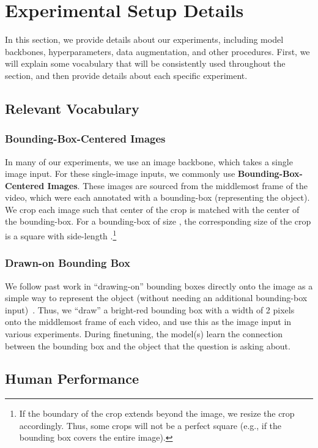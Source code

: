 \documentclass[runningheads]{llncs}
\begin{document}
\section{Experimental Setup Details}\label{appendix:experimental}

In this section, we provide details about our experiments, including model backbones, hyperparameters, data augmentation, and other procedures. First, we will explain some vocabulary that will be consistently used throughout the section, and then provide details about each specific experiment. 

\subsection{Relevant Vocabulary}

\subsubsection{Bounding-Box-Centered Images} In many of our experiments, we use an image backbone, which takes a single image input. For these single-image inputs, we commonly use \textbf{Bounding-Box-Centered Images}. These images are sourced from the middlemost frame of the video, which were each annotated with a bounding-box (representing the object). We crop each image such that center of the crop is matched with the center of the bounding-box. For a bounding-box of size , the corresponding size of the crop is a square with side-length .\footnote{If the boundary of the crop extends beyond the image, we resize the crop accordingly. Thus, some crops will not be a perfect square (e.g., if the bounding box covers the entire image).}

\subsubsection{Drawn-on Bounding Box} We follow past work in ``drawing-on'' bounding boxes directly onto the image as a simple way to represent the object (without needing an additional bounding-box input)~\cite{zellers2022merlotreserve,zellers2021merlot}. Thus, we ``draw'' a bright-red bounding box with a width of 2 pixels onto the middlemost frame of each video, and use this as the image input in various experiments. During finetuning, the model(s) learn the connection between the bounding box and the object that the question is asking about. 

\subsection{Human Performance}
\end{document}
